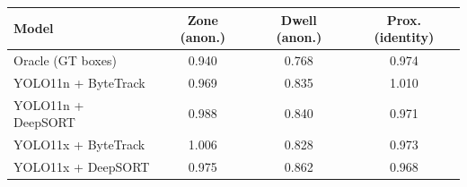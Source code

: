 \begin{tabular}{lccc}
\toprule
Model & Zone (anon.) & Dwell (anon.) & Prox. (identity) \\
\midrule
Oracle (GT boxes) & 0.940 & 0.768 & 0.974 \\
YOLO11n + ByteTrack & 0.969 & 0.835 & 1.010 \\
YOLO11n + DeepSORT & 0.988 & 0.840 & 0.971 \\
YOLO11x + ByteTrack & 1.006 & 0.828 & 0.973 \\
YOLO11x + DeepSORT & 0.975 & 0.862 & 0.968 \\
\bottomrule
\end{tabular}
